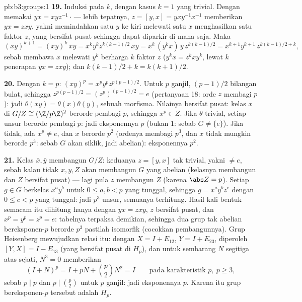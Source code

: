 \begin{solution}{pb:b3:groups:1}
\textbf{19.} Induksi pada $k$, dengan kasus $k = 1$ yang trivial.
Dengan memakai $yx = xyz^{-1}\cdot$\,--- lebih tepatnya, $z = [y, x] =
yxy^{-1}x^{-1}$ memberikan $yx = zxy$, yakni memindahkan satu $y$ ke kiri
melewati satu $x$ menghasilkan satu faktor $z$, yang bersifat pusat sehingga dapat
diparkir di mana saja. Maka
\[
(xy)^{k+1} = (xy)^k\,xy = x^ky^kz^{k(k-1)/2}\,xy
= x^k\,(y^kx)\,y\,z^{k(k-1)/2}
= x^{k+1}y^{k+1}\,z^{k(k-1)/2 + k},
\]
sebab membawa $x$ melewati $y^k$ berharga $k$ faktor $z$ ($y^kx =
z^kxy^k$, lewat $k$ penerapan $yx = zxy$); dan $k(k-1)/2 + k
= k(k+1)/2$.

\textbf{20.} Dengan $k = p$: $(xy)^p = x^py^pz^{p(p-1)/2}$. Untuk
$p$ ganjil, $(p-1)/2$ bilangan bulat, sehingga $z^{p(p-1)/2} =
(z^p)^{(p-1)/2} = e$ (pertanyaan 18: orde $z$ membagi $p$):
jadi $\theta(xy) = \theta(x)\theta(y)$, sebuah morfisma. Nilainya bersifat
pusat: kelas $x$ di $G/Z \cong (\Z/p\Z)^2$ berorde
pembagi $p$, sehingga $x^p \in Z$. Jika $\theta$ trivial, setiap
unsur berorde pembagi $p$: jadi eksponennya $p$ (bukan $1$: sebab $G \neq
\{e\}$). Jika tidak, ada $x^p \neq e$, dan $x$ berorde $p^2$
(ordenya membagi $p^3$, dan $x$ tidak mungkin berorde $p^3$: sebab $G$
akan siklik, jadi abelian): eksponennya $p^2$.

\textbf{21.} Kelas $\bar x, \bar y$ membangun $G/Z$: 
keduanya $z = [y, x]$ tak trivial, yakni $\neq e$, sebab kalau tidak $x, y, Z$ akan
membangun $G$ yang abelian (kelasnya membangun  dan
$Z$ bersifat pusat) --- lagi pula $z$ membangun $Z$ (karena $\abs Z = p$). Setiap
$g \in G$ berkelas $\bar x^a\bar y^b$ untuk $0 \leq a, b <
p$ yang tunggal, sehingga $g = x^ay^bz^c$ dengan $0 \leq c < p$ yang tunggal: jadi $p^3$
unsur, semuanya terhitung. Hasil kali bentuk  semacam itu
dihitung hanya dengan $yx = zxy$, $z$ bersifat pusat, dan $x^p = y^p =
z^p = e$: tabelnya terpaksa demikian, sehingga dua grup tak abelian
bereksponen-$p$ berorde $p^3$ pastilah isomorfik (cocokkan
pembangunnya). Grup Heisenberg mewujudkan relasi itu: dengan
$X = I + E_{12}$, $Y = I + E_{23}$, diperoleh $[Y, X] = I -
E_{13}$ (yang bersifat pusat di $H_p$), dan untuk sembarang $N$ segitiga atas
sejati, $N^3 = 0$ memberikan
\[
(I + N)^p = I + pN + \binom p2N^2 = I
\qquad\text{pada karakteristik } p,\ p \geq 3,
\]
sebab $p \mid p$ dan $p \mid \binom p2$ untuk $p$ ganjil: jadi eksponennya
$p$. Karena itu grup bereksponen-$p$ tersebut adalah $H_p$.


\end{solution}
